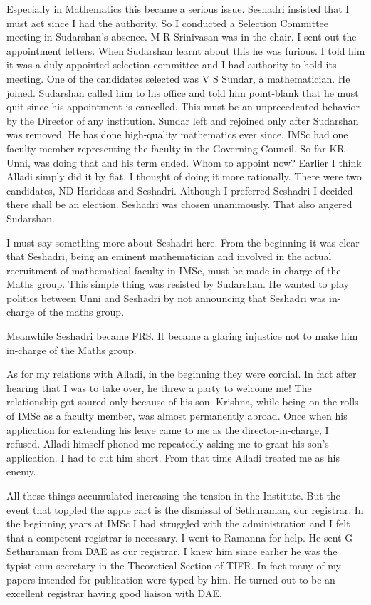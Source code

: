 Especially in Mathematics this became a serious issue. Seshadri insisted 
that I must act since I had the authority. So I conducted a Selection 
Committee meeting in Sudarshan's absence. M R Srinivasan was in the 
chair. I sent out the appointment le\-tters. When Sudarshan learnt about 
this he was furious. I told him it was a duly appointed selection 
committee and I had autho\-rity to hold its meeting.
\vskip 1pt
One of the candidates selected was V S Sundar, a mathema\-tician. He 
joined. Sudarshan called him to his office and told him point-blank that 
he must quit since his appointment is cance\-lled. This must be an 
unprecedented behavior by the Director of any institution. Sundar left 
and rejoined only after Sudarshan was removed. He has done high-quality 
mathematics ever since.
\vskip 1pt
IMSc had one faculty member representing the faculty in the Governing 
Council. So far KR Unni, was doing that and his term ended. Whom to 
appoint now? Earlier I think Alladi simply did it by fiat. I thought of 
doing it more rationally. There were two candidates, ND Haridass and 
Seshadri. Although I preferred Seshadri I decided there shall be an 
election. Seshadri was chosen unanimously. That also angered Sudarshan.

I must say something more about Seshadri here. From the beginning it was 
clear that Seshadri, being an eminent mathematician and involved in the 
actual recruitment of mathematical faculty in IMSc, must be made 
in-charge of the Maths group. This simple thing was resisted by 
Sudarshan. He wanted to play politics between Unni and Seshadri by not 
announcing that Seshadri was in-charge of the maths group.

Meanwhile Seshadri became FRS. It became a glaring injustice not to make 
him in-charge of the Maths group.

As for my relations with Alladi, in the beginning they were cordial. 
In fact after hearing that I was to take over, he threw a party to 
welcome me! The relationship got soured only because of his son. 
Krishna, while being on the rolls of IMSc as a fa\-culty member, was 
almost permanently abroad. Once when his appli\-cation for extending his 
leave came to me as the director-in-charge, I refused. Alladi himself 
phoned me repeatedly asking me to grant his son's application. I had to 
cut him short. From that time Alladi treated me as his enemy.
 
All these things accumulated increasing the tension in the Institute. 
But the event that toppled the apple cart is the dismissal of 
Sethuraman, our registrar. In the beginning years at IMSc I had 
struggled with the administration and I felt that a competent registrar 
is necessary. I went to Ramanna for help. He sent G Sethuraman from DAE 
as our registrar. I knew him since earlier he was the typist cum 
secretary in the Theoretical Section of TIFR. In fact many of my papers 
intended for publication were typed by him. He turned out to be an 
excellent regi\-strar having good liaison with DAE.

